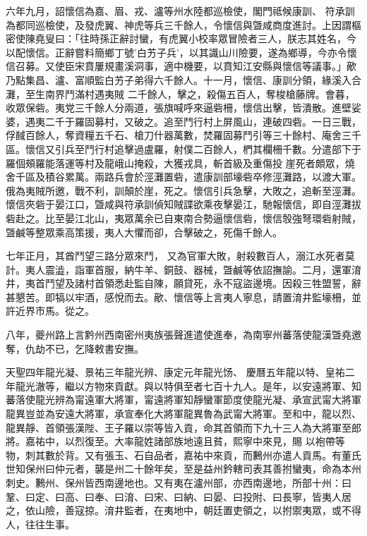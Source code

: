\begin{pinyinscope}
 六年九月，詔懷信為嘉、眉、戎、瀘等州水陸都巡檢使，閣門祗候康訓、
 符承訓為都同巡檢使，及發虎翼、神虎等兵三千餘人，令懷信與曁咸商度進討。上因謂樞密使陳堯叟曰：「往時孫正辭討蠻，有虎翼小校率眾冒險者三人，朕志其姓名，今以配懷信。正辭嘗料簡鄉丁號'白艻子兵'，以其識山川險要，遂為鄉導，今亦令懷信召募。又使臣宋賁屢規畫溪洞事，適中機要，以賁知江安縣與懷信等議事。」歒乃點集昌、瀘、富順監白艻子弟得六千餘人。十一月，懷信、康訓分領，緣溪入合灘，至生南界鬥滿村遇夷賊
 二千餘人，擊之，殺傷五百人，奪梭槍藤牌。會暮，收眾保砦。夷党三千餘人分兩道，張旗喊呼來逼砦柵，懷信出擊，皆潰散。進壁娑婆，遇夷二千于羅固募村，又破之。追至鬥行村上屏風山，連破四砦。一日三戰，俘馘百餘人，奪資糧五千石、槍刀什器萬數，焚羅固募鬥引等三十餘村、庵舍三千區。懷信又引兵至鬥行村追擊過盧羅，射僕二百餘人，椚其欄柵千數。分遣部下于羅個頰羅能落運等村及龍峨山掩殺，大獲戎具，斬首級及重傷投
 崖死者頗眾，燒舍千區及積谷累萬。兩路兵會於涇灘置砦，遣康訓部壕砦卒修涇灘路，以渡大軍。俄為夷賊所邀，戰不利，訓顛於崖，死之。懷信引兵急擊，大敗之，追斬至涇灘。懷信夾砦于晏江口，曁咸與符承訓偵知賊諜欲乘夜擊晏江，馳報懷信，即自涇灘拔砦赴之。比至晏江北山，夷眾萬余已自東南合勢逼懷信砦，懷信彀強弩環砦射賊，曁鹹等整眾乘高策援，夷人大懼而卻，合擊破之，死傷千餘人。



 七年正月，其酋鬥望三路分眾來鬥，
 又為官軍大敗，射殺數百人，溺江水死者莫計。夷人震澁，詣軍首服，納牛羊、銅鼓、器械，曁鹹等依詔撫諭。二月，還軍淯井，夷首鬥望及諸村首領悉赴監自陳，願貸死，永不寇盜邊境。因殺三牲盟誓，辭甚懇苦。即犒以牢酒，感悅而去。歒、懷信等上言夷人寧息，請置淯井監壕柵，並許近界市馬。從之。



 八年，夔州路上言黔州西南密州夷族張聲進遣使進奉，為南寧州蕃落使龍漢曁堯邀奪，仇劫不已，乞降敕書安撫。



 天聖四年龍光凝、景祐三年龍光辨、康定元年龍光饧、
 慶曆五年龍以特、皇祐二年龍光澈等，繼以方物來貢獻。與以特俱至者七百十九人。是年，以安遠將軍、知蕃落使龍光辨為甯遠軍大將軍，甯遠將軍知靜蠻軍節度使龍光凝、承宣武甯大將軍龍異豈並為安遠大將軍，承宣奉化大將軍龍異魯為武甯大將軍。至和中，龍以烈、龍異靜、首領張漢陛、王子羅以崇等皆入貢，命其首領而下九十三人為大將軍至郎將。嘉祐中，以烈復至。大率龍姓諸部族地遠且貧，熙寧中來見，賜
 以袍帶等物，刺其數於背。又有張玉、石自品者，嘉祐中來貢，而鶼州亦遣人貢馬。有董氏世知保州曰仲元者，襲是州二十餘年矣，至是益州鈐轄司表其善拊蠻夷，命為本州刺史。鶼州、保州皆西南邊地也。又有夷在瀘州部，亦西南邊地，所部十州：曰鞏、曰定、曰高、曰奉、曰淯、曰宋、曰納、曰晏、曰投附、曰長寧，皆夷人居之，依山險，善寇掠。淯井監者，在夷地中，朝廷置吏領之，以拊禦夷眾，或不得人，往往生事。




\end{pinyinscope}
